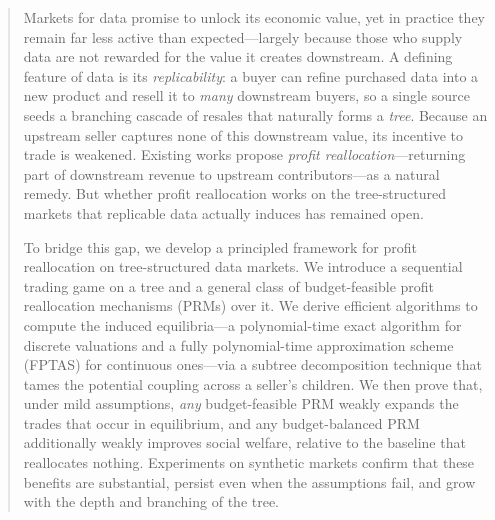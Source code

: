\begin{abstract}
Markets for data promise to unlock its economic value, yet in practice they remain far less active than expected---largely because those who supply data are not rewarded for the value it creates downstream. A defining feature of data is its \emph{replicability}: a buyer can refine purchased data into a new product and resell it to \emph{many} downstream buyers, so a single source seeds a branching cascade of resales that naturally forms a \emph{tree}. Because an upstream seller captures none of this downstream value, its incentive to trade is weakened. Existing works propose \emph{profit reallocation}---returning part of downstream revenue to upstream contributors---as a natural remedy. But whether profit reallocation works on the tree-structured markets that replicable data actually induces has remained open.

To bridge this gap, we develop a principled framework for profit reallocation on tree-structured data markets. We introduce a sequential trading game on a tree and a general class of budget-feasible profit reallocation mechanisms (PRMs) over it. We derive efficient algorithms to compute the induced equilibria---a polynomial-time exact algorithm for discrete valuations and a fully polynomial-time approximation scheme (FPTAS) for continuous ones---via a subtree decomposition technique that tames the potential coupling across a seller's children. We then prove that, under mild assumptions, \emph{any} budget-feasible PRM weakly expands the trades that occur in equilibrium, and any budget-balanced PRM additionally weakly improves social welfare, relative to the baseline that reallocates nothing. Experiments on synthetic markets confirm that these benefits are substantial, persist even when the assumptions fail, and grow with the depth and branching of the tree.

\end{abstract}
